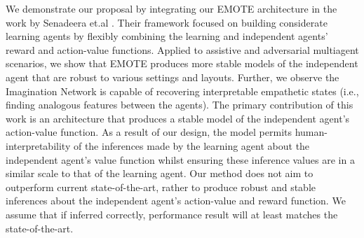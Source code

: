 We demonstrate our proposal by integrating our EMOTE architecture in the work by Senadeera et.al  \cite{SympathyPaper}. %
Their framework focused on
building considerate learning agents by flexibly combining the learning and independent agents' reward and action-value functions. 
Applied to assistive and adversarial multiagent scenarios, we show that EMOTE produces more stable models of the independent agent that are robust to various settings and layouts.
Further, we observe the Imagination Network is capable of recovering interpretable empathetic states (i.e., finding analogous features between the agents). The primary contribution of this work is an architecture that produces a stable model of the independent agent's action-value function. As a result of our design, the model permits human-interpretability of the inferences made by the learning agent about the independent agent's value function whilst ensuring these inference values are in a similar scale to that of the learning agent. Our method does not aim to outperform current state-of-the-art, rather to produce robust and stable inferences about the independent agent's action-value and reward function. We assume that if inferred correctly, performance result will at least matches the state-of-the-art.


